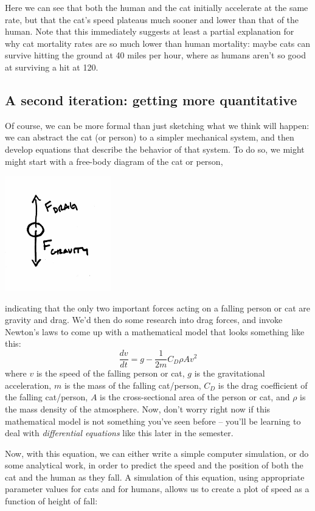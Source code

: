 Here we can see that both the human and the cat initially accelerate at the same rate, but that the cat's speed plateaus much sooner and lower than that of the human.  Note that this immediately suggests at least a partial explanation for why cat mortality rates are so much lower than human mortality:  maybe cats can survive hitting the ground at 40 miles per hour, where as humans aren't so good at surviving a hit at 120.

\subsection{A second iteration: getting more quantitative}
Of course, we can be more formal than just sketching what we think will happen:  we can abstract the cat (or person) to a simpler mechanical system, and then develop equations that describe the behavior of that system.  To do so, we might might start with a free-body diagram of the cat or person,

\centerline{\includegraphics[height=5cm]{figs/CatFBD}}

indicating that the only two important forces acting on a falling person or cat are gravity and drag.
We'd then do some research into drag forces, and invoke Newton's laws to come up with a mathematical model that looks something like this:
$$ \frac{dv}{dt} = g - \frac{1}{2m} C_D \rho A v^2$$
where $v$ is the speed of the falling person or cat, $g$ is the gravitational acceleration, $m$ is the mass of the falling cat/person, $C_D$ is the drag coefficient of the falling cat/person, $A$ is the cross-sectional area of the person or cat, and $\rho$ is the mass density of the atmosphere.  Now, don't worry right now if this mathematical model is not something you've seen before -- you'll be learning to deal with {\it differential equations} like this later in the semester.  

Now, with this equation, we can either write a simple computer simulation, or do some analytical work, in order to predict the speed and the position of both the cat and the human as they fall.  A simulation of this equation, using appropriate parameter values for cats and for humans, allows us to create a plot of speed as a function of height of fall:


